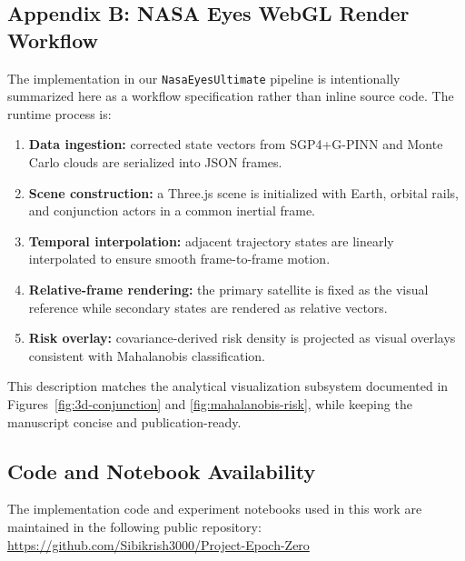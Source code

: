 \documentclass[twocolumn]{article}
\begin{document}
\subsection*{Appendix B: NASA Eyes WebGL Render Workflow}
The implementation in our \texttt{NasaEyesUltimate} pipeline is intentionally summarized here as a workflow specification rather than inline source code. The runtime process is:
\begin{enumerate}[leftmargin=*]
    \item \textbf{Data ingestion:} corrected state vectors from SGP4+G-PINN and Monte Carlo clouds are serialized into JSON frames.
    \item \textbf{Scene construction:} a Three.js scene is initialized with Earth, orbital rails, and conjunction actors in a common inertial frame.
    \item \textbf{Temporal interpolation:} adjacent trajectory states are linearly interpolated to ensure smooth frame-to-frame motion.
    \item \textbf{Relative-frame rendering:} the primary satellite is fixed as the visual reference while secondary states are rendered as relative vectors.
    \item \textbf{Risk overlay:} covariance-derived risk density is projected as visual overlays consistent with Mahalanobis classification.
\end{enumerate}

This description matches the analytical visualization subsystem documented in Figures~\ref{fig:3d-conjunction} and \ref{fig:mahalanobis-risk}, while keeping the manuscript concise and publication-ready.




\subsection*{Code and Notebook Availability}
The implementation code and experiment notebooks used in this work are maintained in the following public repository:
\href{https://github.com/Sibikrish3000/Project-Epoch-Zero}{https://github.com/Sibikrish3000/Project-Epoch-Zero}

\newpage


\end{document}
